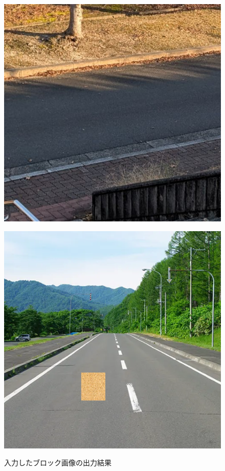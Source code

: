 \documentclass[twocolumn, a4j]{jsarticle}
\begin{document}
\begin{figure}[h]
  \begin{minipage}[]{0.49\columnwidth}
    \centering
    \includegraphics[width=0.9\columnwidth]{figure/road_image2.bmp}
    \label{fig:4-3-1}
  \end{minipage}
  \begin{minipage}[]{0.49\linewidth}
    \centering
    \includegraphics[width=0.9\columnwidth]{figure/road_image4.png}
    \label{fig:4-3-2}
  \end{minipage}
  \caption{入力したブロック画像の出力結果}
  \label{fig:4-3}
\end{figure}
\end{document}
